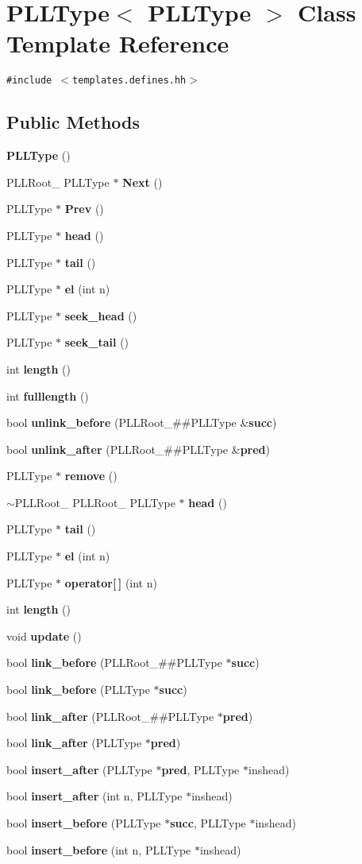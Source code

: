 \section{PLLType$<$ PLLType $>$  Class Template Reference}
\label{classPLLType}
{\tt \#include $<$templates.defines.hh$>$}

\subsection*{Public Methods}
\begin{CompactItemize}
\item 
{\bf PLLType} ()
\item 
PLLRoot\_\- PLLType $\ast$ {\bf Next} ()
\item 
PLLType $\ast$ {\bf Prev} ()
\item 
PLLType $\ast$ {\bf head} ()
\item 
PLLType $\ast$ {\bf tail} ()
\item 
PLLType $\ast$ {\bf el} (int n)
\item 
PLLType $\ast$ {\bf seek\_\-head} ()
\item 
PLLType $\ast$ {\bf seek\_\-tail} ()
\item 
int {\bf length} ()
\item 
int {\bf fulllength} ()
\item 
bool {\bf unlink\_\-before} (PLLRoot\_\-\#\#PLLType \&{\bf succ})
\item 
bool {\bf unlink\_\-after} (PLLRoot\_\-\#\#PLLType \&{\bf pred})
\item 
PLLType $\ast$ {\bf remove} ()
\item 
$\sim$PLLRoot\_\- PLLRoot\_\- PLLType $\ast$ {\bf head} ()
\item 
PLLType $\ast$ {\bf tail} ()
\item 
PLLType $\ast$ {\bf el} (int n)
\item 
PLLType $\ast$ {\bf operator[$\,$]} (int n)
\item 
int {\bf length} ()
\item 
void {\bf update} ()
\item 
bool {\bf link\_\-before} (PLLRoot\_\-\#\#PLLType $\ast${\bf succ})
\item 
bool {\bf link\_\-before} (PLLType $\ast${\bf succ})
\item 
bool {\bf link\_\-after} (PLLRoot\_\-\#\#PLLType $\ast${\bf pred})
\item 
bool {\bf link\_\-after} (PLLType $\ast${\bf pred})
\item 
bool {\bf insert\_\-after} (PLLType $\ast${\bf pred}, PLLType $\ast$inshead)
\item 
bool {\bf insert\_\-after} (int n, PLLType $\ast$inshead)
\item 
bool {\bf insert\_\-before} (PLLType $\ast${\bf succ}, PLLType $\ast$inshead)
\item 
bool {\bf insert\_\-before} (int n, PLLType $\ast$inshead)
\end{CompactItemize}
